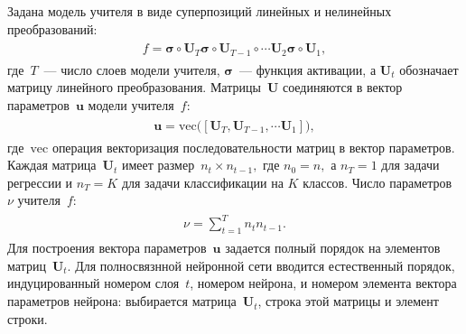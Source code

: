 \documentclass[12pt]{a&t}
\begin{document}
Задана модель учителя в виде суперпозиций линейных и нелинейных преобразований:
\begin{gather}
\label{eq:st:2}
\begin{aligned}
f = \bm{\sigma} \circ \mathbf{U}_T \bm{\sigma} \circ \mathbf{U}_{T-1}\circ \cdots  \mathbf{U}_2\bm{\sigma} \circ \mathbf{U}_1,
\end{aligned}
\end{gather}
где~$T$~--- число слоев модели учителя, $\bm{\sigma}$~--- функция активации, а $\mathbf{U}_t$ обозначает матрицу линейного преобразования. Матрицы~$\mathbf{U}$ соединяются в вектор параметров~$\mathbf{u}$ модели учителя~$f$:
\begin{gather}
\label{eq:st:2.1}
\begin{aligned}
\mathbf{u} = \text{vec}\bigr(\left[\mathbf{U}_T, \mathbf{U}_{T-1}, \cdots \mathbf{U}_1\right]\bigr),
\end{aligned}
\end{gather}
где~$\text{vec}$ операция векторизация последовательности матриц в вектор параметров.
Каждая матрица~$\mathbf{U}_t$ имеет размер~$n_t\times n_{t-1},$ где $n_0=n,$ а  $n_T={1}$ для задачи регрессии и $n_T=K$ для задачи классификации на $K$ классов. Число параметров~$\nu$ учителя~$f$:
\begin{gather}
\label{eq:st:2.2}
\begin{aligned}
\nu = \sum_{t=1}^{T}n_tn_{t-1}.
\end{aligned}
\end{gather}
Для построения вектора параметров~$\mathbf{u}$ задается полный порядок на элементов матриц~$\mathbf{U}_t$. Для полносвязнной нейронной сети вводится естественный порядок, индуцированный номером слоя~$t$, номером нейрона, и номером элемента вектора параметров нейрона: выбирается матрица~$\mathbf{U}_t$, строка этой матрицы и элемент строки.
\end{document}
